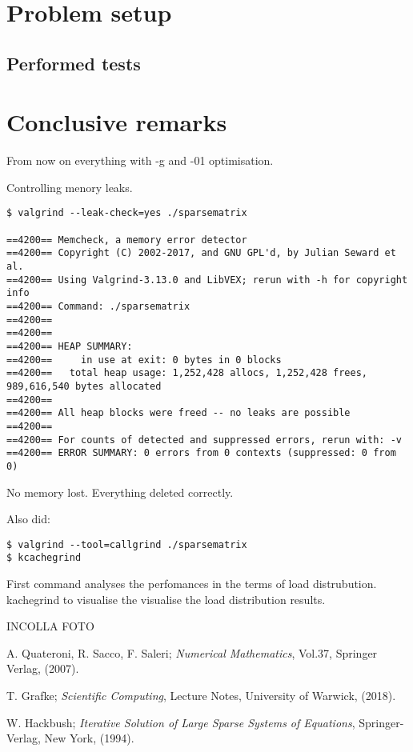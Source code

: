 \documentclass{article}
\theoremstyle{theorem}
\theoremstyle{definition}
\begin{document}
\section{Problem setup}
\subsection{Performed tests}

\section{Conclusive remarks}


From now on everything with -g and -01 optimisation. 

Controlling menory leaks.

\begin{verbatim}
$ valgrind --leak-check=yes ./sparsematrix

==4200== Memcheck, a memory error detector
==4200== Copyright (C) 2002-2017, and GNU GPL'd, by Julian Seward et al.
==4200== Using Valgrind-3.13.0 and LibVEX; rerun with -h for copyright info
==4200== Command: ./sparsematrix
==4200== 
==4200== 
==4200== HEAP SUMMARY:
==4200==     in use at exit: 0 bytes in 0 blocks
==4200==   total heap usage: 1,252,428 allocs, 1,252,428 frees, 989,616,540 bytes allocated
==4200== 
==4200== All heap blocks were freed -- no leaks are possible
==4200== 
==4200== For counts of detected and suppressed errors, rerun with: -v
==4200== ERROR SUMMARY: 0 errors from 0 contexts (suppressed: 0 from 0)
\end{verbatim}

No memory lost. Everything deleted correctly.


Also did:
\begin{verbatim}
$ valgrind --tool=callgrind ./sparsematrix
$ kcachegrind
\end{verbatim}

First command analyses the perfomances in the terms of load distrubution. kachegrind to visualise the visualise the load distribution results.

INCOLLA FOTO



\cleardoublepage
\begin{thebibliography}{99}

 A. Quateroni, R. Sacco, F. Saleri;
\emph{Numerical Mathematics}, Vol.37, Springer Verlag, (2007).

 T. Grafke;
\emph{Scientific Computing}, Lecture Notes, University of Warwick, (2018).

 W. Hackbush; 
\emph{Iterative Solution of Large Sparse Systems of Equations}, Springer-Verlag, New York, (1994).







\printindex
\end{thebibliography}
\end{document}
